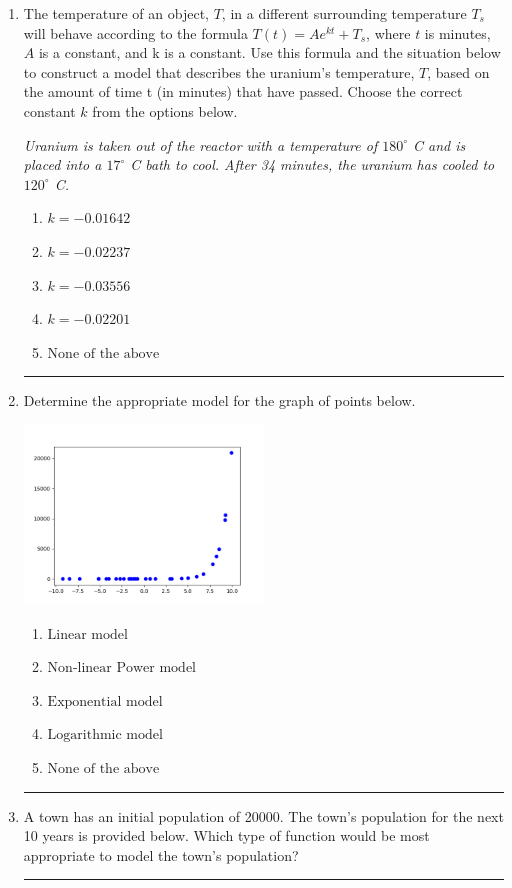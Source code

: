 \documentclass[14pt]{extbook}
\newcommand{\litem}[1]{\item#1\hspace*{-1cm}\rule{\textwidth}{0.4pt}}
\begin{document}
\begin{enumerate}
{\begin{enumerate}[label=\Alph*.]
\end{enumerate} }
\litem{
The temperature of an object, $T$, in a different surrounding temperature $T_s$ will behave according to the formula $T(t) = Ae^{kt} + T_s$, where $t$ is minutes, $A$ is a constant, and k is a constant. Use this formula and the situation below to construct a model that describes the uranium's temperature, $T$, based on the amount of time t (in minutes) that have passed. Choose the correct constant $k$ from the options below.
\begin{center}
    \textit{ Uranium is taken out of the reactor with a temperature of $180^{\circ}$ C and is placed into a $17^{\circ}$ C bath to cool. After 34 minutes, the uranium has cooled to $120^{\circ}$ C. }
\end{center}
\begin{enumerate}[label=\Alph*.]
\item \( k = -0.01642 \)
\item \( k = -0.02237 \)
\item \( k = -0.03556 \)
\item \( k = -0.02201 \)
\item \( \text{None of the above} \)

\end{enumerate} }
\litem{
Determine the appropriate model for the graph of points below.
\begin{center}
    \includegraphics[width=0.5\textwidth]{../Figures/identifyModelGraph11B.png}
\end{center}
\begin{enumerate}[label=\Alph*.]
\item \( \text{Linear model} \)
\item \( \text{Non-linear Power model} \)
\item \( \text{Exponential model} \)
\item \( \text{Logarithmic model} \)
\item \( \text{None of the above} \)

\end{enumerate} }
\litem{
A town has an initial population of 20000. The town's population for the next 10 years is provided below. Which type of function would be most appropriate to model the town's population?

}
\end{enumerate}
\end{document}
